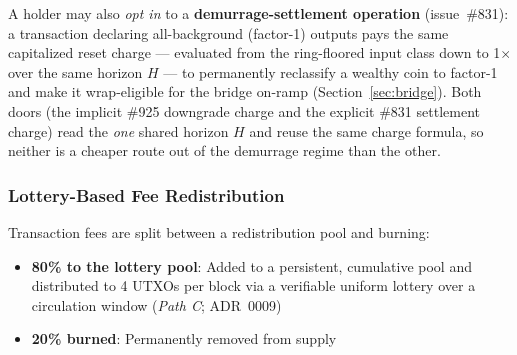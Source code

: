 A holder may also \emph{opt in} to a \textbf{demurrage-settlement operation}
(issue~\#831): a transaction declaring all-background (factor-1) outputs pays
the same capitalized reset charge --- evaluated from the ring-floored input
class down to 1$\times$ over the same horizon $H$ --- to permanently reclassify
a wealthy coin to factor-1 and make it wrap-eligible for the bridge on-ramp
(Section~\ref{sec:bridge}). Both doors (the implicit \#925 downgrade charge and
the explicit \#831 settlement charge) read the \emph{one} shared horizon $H$
and reuse the same charge formula, so neither is a cheaper route out of the
demurrage regime than the other.

\subsubsection{Lottery-Based Fee Redistribution}

Transaction fees are split between a redistribution pool and burning:

\begin{itemize}
  \item \textbf{80\% to the lottery pool}: Added to a persistent,
    cumulative pool and distributed to 4 UTXOs per block via a verifiable
    uniform lottery over a circulation window (\emph{Path C}; ADR~0009)
  \item \textbf{20\% burned}: Permanently removed from supply
\end{itemize}

